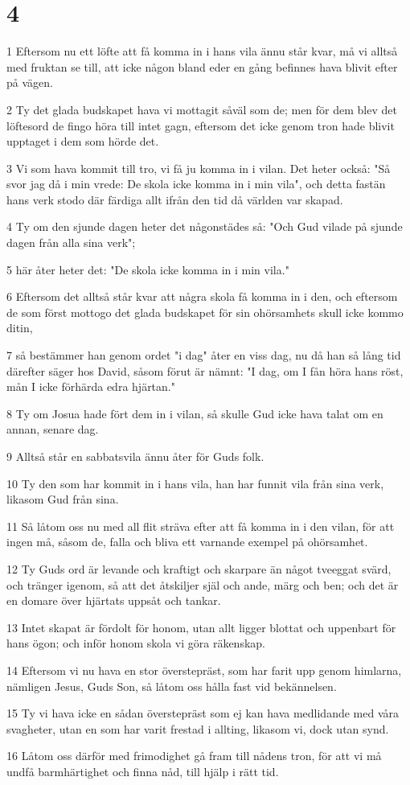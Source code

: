 \chapter{4}

\par 1 Eftersom nu ett löfte att få komma in i hans vila ännu står kvar, må vi alltså med fruktan se till, att icke någon bland eder en gång befinnes hava blivit efter på vägen.
\par 2 Ty det glada budskapet hava vi mottagit såväl som de; men för dem blev det löftesord de fingo höra till intet gagn, eftersom det icke genom tron hade blivit upptaget i dem som hörde det.
\par 3 Vi som hava kommit till tro, vi få ju komma in i vilan. Det heter också: "Så svor jag då i min vrede: De skola icke komma in i min vila", och detta fastän hans verk stodo där färdiga allt ifrån den tid då världen var skapad.
\par 4 Ty om den sjunde dagen heter det någonstädes så: "Och Gud vilade på sjunde dagen från alla sina verk";
\par 5 här åter heter det: "De skola icke komma in i min vila."
\par 6 Eftersom det alltså står kvar att några skola få komma in i den, och eftersom de som först mottogo det glada budskapet för sin ohörsamhets skull icke kommo ditin,
\par 7 så bestämmer han genom ordet "i dag" åter en viss dag, nu då han så lång tid därefter säger hos David, såsom förut är nämnt: "I dag, om I fån höra hans röst, mån I icke förhärda edra hjärtan."
\par 8 Ty om Josua hade fört dem in i vilan, så skulle Gud icke hava talat om en annan, senare dag.
\par 9 Alltså står en sabbatsvila ännu åter för Guds folk.
\par 10 Ty den som har kommit in i hans vila, han har funnit vila från sina verk, likasom Gud från sina.
\par 11 Så låtom oss nu med all flit sträva efter att få komma in i den vilan, för att ingen må, såsom de, falla och bliva ett varnande exempel på ohörsamhet.
\par 12 Ty Guds ord är levande och kraftigt och skarpare än något tveeggat svärd, och tränger igenom, så att det åtskiljer själ och ande, märg och ben; och det är en domare över hjärtats uppsåt och tankar.
\par 13 Intet skapat är fördolt för honom, utan allt ligger blottat och uppenbart för hans ögon; och inför honom skola vi göra räkenskap.
\par 14 Eftersom vi nu hava en stor överstepräst, som har farit upp genom himlarna, nämligen Jesus, Guds Son, så låtom oss hålla fast vid bekännelsen.
\par 15 Ty vi hava icke en sådan överstepräst som ej kan hava medlidande med våra svagheter, utan en som har varit frestad i allting, likasom vi, dock utan synd.
\par 16 Låtom oss därför med frimodighet gå fram till nådens tron, för att vi må undfå barmhärtighet och finna nåd, till hjälp i rätt tid.

